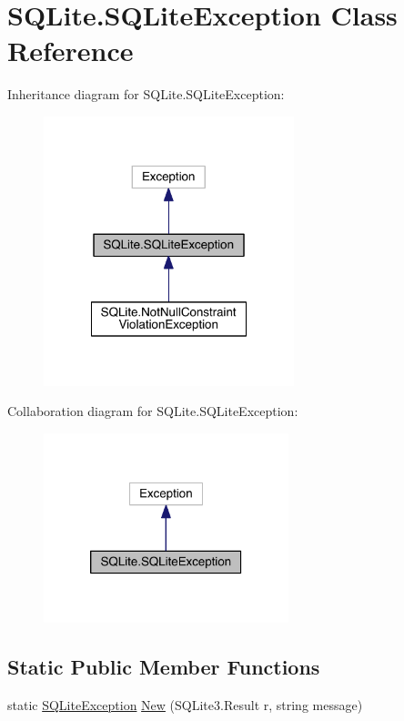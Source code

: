 \hypertarget{class_s_q_lite_1_1_s_q_lite_exception}{\section{S\+Q\+Lite.\+S\+Q\+Lite\+Exception Class Reference}
\label{class_s_q_lite_1_1_s_q_lite_exception}
}


Inheritance diagram for S\+Q\+Lite.\+S\+Q\+Lite\+Exception\+:
\nopagebreak
\begin{figure}[H]
\begin{center}
\leavevmode
\includegraphics[width=206pt]{class_s_q_lite_1_1_s_q_lite_exception__inherit__graph}
\end{center}
\end{figure}


Collaboration diagram for S\+Q\+Lite.\+S\+Q\+Lite\+Exception\+:
\nopagebreak
\begin{figure}[H]
\begin{center}
\leavevmode
\includegraphics[width=202pt]{class_s_q_lite_1_1_s_q_lite_exception__coll__graph}
\end{center}
\end{figure}
\subsection*{Static Public Member Functions}
\begin{DoxyCompactItemize}
\item 
static \hyperlink{class_s_q_lite_1_1_s_q_lite_exception}{S\+Q\+Lite\+Exception} \hyperlink{class_s_q_lite_1_1_s_q_lite_exception_ac74e9093fc476760b090efb43d226a97}{New} (S\+Q\+Lite3.\+Result r, string message)
\end{DoxyCompactItemize}
